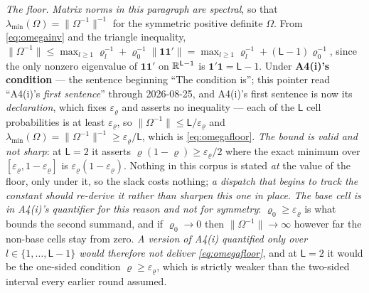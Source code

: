\emph{The floor.} \emph{Matrix norms in this paragraph are spectral}, so that
$\lambda_{\min}(\Omega)=\|\Omega^{-1}\|^{-1}$ for the symmetric positive definite $\Omega$. From
\eqref{eq:omegainv} and the triangle inequality,
$\|\Omega^{-1}\|\le\max_{l\ge1}\varrho_l^{-1}+\varrho_0^{-1}\|\mathbf1\mathbf1'\|
=\max_{l\ge1}\varrho_l^{-1}+(\mathsf L-1)\varrho_0^{-1}$, since the only nonzero eigenvalue of
$\mathbf1\mathbf1'$ on $\mathbb{R}^{\mathsf L-1}$ is $\mathbf1'\mathbf1=\mathsf L-1$. Under \textbf{A4(i)'s
condition} --- the sentence beginning ``The condition is''; this pointer read ``A4(i)'s \emph{first
sentence}'' through 2026-08-25, and A4(i)'s first sentence is now its \emph{declaration}, which fixes
$\varepsilon_\varrho$ and asserts no inequality --- each of the
$\mathsf L$ cell probabilities is at least $\varepsilon_\varrho$, so
$\|\Omega^{-1}\|\le\mathsf L/\varepsilon_\varrho$ and
$\lambda_{\min}(\Omega)=\|\Omega^{-1}\|^{-1}\ge\varepsilon_\varrho/\mathsf L$, which is
\eqref{eq:omegafloor}. \emph{The bound is valid and not sharp}: at $\mathsf L=2$ it asserts
$\varrho(1-\varrho)\ge\varepsilon_\varrho/2$ where the exact minimum over
$[\varepsilon_\varrho,1-\varepsilon_\varrho]$ is $\varepsilon_\varrho(1-\varepsilon_\varrho)$. Nothing in
this corpus is stated \emph{at} the value of the floor, only under it, so the slack costs nothing;
\emph{a dispatch that begins to track the constant should re-derive it rather than sharpen this one in
place}. \emph{The base cell is in A4(i)'s quantifier for this reason and not for symmetry}:
$\varrho_0\ge\varepsilon_\varrho$ is what bounds the second summand, and if $\varrho_0\to0$ then
$\|\Omega^{-1}\|\to\infty$ however far the non-base cells stay from zero. \emph{A version of A4(i)
quantified only over $l\in\{1,\dots,\mathsf L-1\}$ would therefore not deliver
\eqref{eq:omegafloor}}, and at $\mathsf L=2$ it would be the one-sided condition
$\varrho\ge\varepsilon_\varrho$, which is strictly weaker than the two-sided interval every earlier
round assumed.

